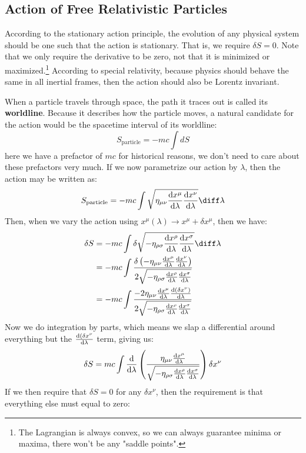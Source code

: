 \subsection{Action of Free Relativistic Particles}
According to the stationary action principle, the evolution of any physical system should be one such that
the action is stationary. That is, we require \( \delta S = 0 \). Note that we only require the derivative to
be zero, not that it is minimized or maximized.\footnote{The Lagrangian is always convex, so we can always
guarantee minima or maxima, there won't be any "saddle points".} According to special relativity, because
physics should behave the same in all inertial frames, then the action should also be Lorentz invariant. 

When a particle travels through space, the path it traces out is called its \textbf{worldline}. Because it
describes how the particle moves, a natural candidate for the action would be the spacetime interval of its
worldline:
\[
	S_\text{particle} = -mc \int dS
\]
here we have a prefactor of \( mc \) for historical reasons, we don't need to care about these prefactors
very much. If we now parametrize our action by \( \lambda \), then the action may be written as:
\[
	S_\text{particle} = -mc \int \sqrt{\eta_{\mu \nu} \dv{x^{\mu}}{\lambda} \dv{x^{\nu}}{\lambda}} \diff\lambda
\]
Then, when we vary the action using \( x^{\mu}(\lambda) \to x^{\mu} + \delta x^{\mu} \), then we have:
\begin{align*}
	\delta S &= -mc \int \delta\sqrt{-\eta_{\rho \sigma} \dv{x^{\rho}}{\lambda} \dv{x^{\sigma}}{\lambda}}
	\diff \lambda \\ 
			 &= -mc \int \frac{\delta\left( -\eta_{\mu \nu} \dv{x^{\mu}}{\lambda} \dv{x^{\nu}}{\lambda}
			 \right)}{2 \sqrt{-\eta_{\rho \sigma} \dv{x^{\rho}}{\lambda} \dv{x^{\sigma}}{\lambda}}} \\ 
			 &= -mc \int \frac{-2 \eta_{\mu \nu} \dv{x^{\mu}}{\lambda} \dv{(\delta x^{\nu})}{\lambda}}{2
			 \sqrt{-\eta_{\rho \sigma} \dv{x^{\rho}}{\lambda} \dv{x^{\sigma}}{\lambda}}} 
\end{align*}
Now we do integration by parts, which means we slap a differential around everything but the \( \dv{(\delta
x^{\nu}}{\lambda} \) term, giving us:
\[
	\delta S = mc \int \dv{\lambda} \left( \frac{\eta_{\mu \nu} \dv{x^{\mu}}{\lambda}}{\sqrt{-\eta_{\rho
	\sigma} \dv{x^{\rho}}{\lambda} \dv{x^{\sigma}}{\lambda}}} \right) \delta x^{\nu}
\]
If we then require that \( \delta S = 0 \) for any \( \delta x^{\nu} \), then the requirement is that
everything else must equal to zero:
